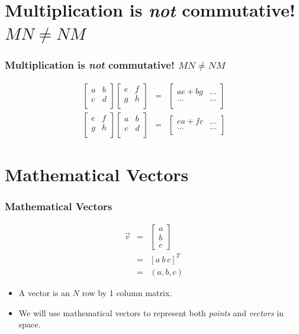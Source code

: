 \documentclass[]{beamer}
\newcommand{\sect}[1]{
\section{#1}
\begin{frame}[fragile]\frametitle{#1}
}
\begin{document}
\sect{Multiplication is {\em not} commutative!  $MN \not=NM$}
\begin{eqnarray*}
\left[\begin{array}{cc}
a & b \\
c & d \\
\end{array}
\right]
\left[\begin{array}{cc}
e & f \\
g & h \\
\end{array}
\right]
&=&\left[\begin{array}{cc}
ae+bg & ... \\
... & ... \\
\end{array}
\right]
\\
\left[\begin{array}{cc}
e & f \\
g & h \\
\end{array}
\right]
\left[\begin{array}{cc}
a & b \\
c & d \\
\end{array}
\right]
&=&\left[\begin{array}{cc}
ea+fc & ... \\
... & ... \\
\end{array}
\right]
\end{eqnarray*}
\end{frame}

\sect{Mathematical Vectors}
\begin{eqnarray*}
\vec{v} &=& \left[\begin{array}{c} a\\b\\c \end{array}\right]\\
        &=& [a\  b\  c]^T \\
        &=& (a,b,c)
\end{eqnarray*}
\begin{itemize}
\item A vector is an $N$ row by 1 column matrix.
\item We will use mathematical vectors to represent both {\em points} and {\em vectors} in space.
\end{itemize}
\end{frame}
\end{document}
